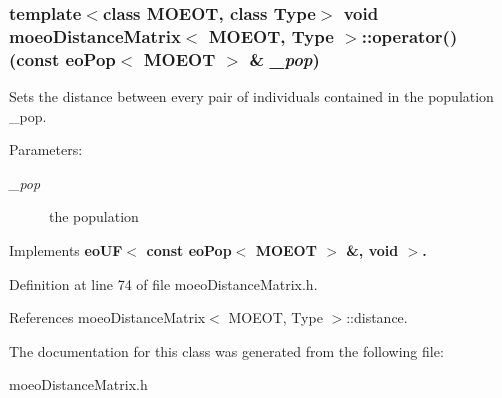 \subsubsection{\setlength{\rightskip}{0pt plus 5cm}template$<$class MOEOT, class Type$>$ void \bf{moeo\-Distance\-Matrix}$<$ MOEOT, Type $>$::operator() (const \bf{eo\-Pop}$<$ MOEOT $>$ \& {\em \_\-pop})\hspace{0.3cm}{\tt  [inline, virtual]}}\label{classmoeoDistanceMatrix_ae3d433983a0a3d369cc17971498ad48}


Sets the distance between every pair of individuals contained in the population \_\-pop. 

\begin{Desc}
\item[Parameters:]
\begin{description}
\item[{\em \_\-pop}]the population \end{description}
\end{Desc}


Implements \bf{eo\-UF$<$ const eo\-Pop$<$ MOEOT $>$ \&, void $>$}.

Definition at line 74 of file moeo\-Distance\-Matrix.h.

References moeo\-Distance\-Matrix$<$ MOEOT, Type $>$::distance.

The documentation for this class was generated from the following file:\begin{CompactItemize}
\item 
moeo\-Distance\-Matrix.h\end{CompactItemize}
